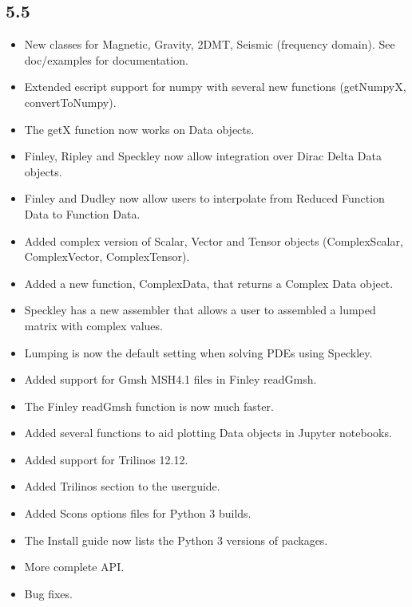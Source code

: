 \subsection*{5.5}
\begin{itemize}
\item New classes for Magnetic, Gravity, 2DMT, Seismic (frequency domain). See doc/examples for documentation.
\item Extended escript support for numpy with several new functions (getNumpyX, convertToNumpy).
\item The getX function now works on Data objects.
\item Finley, Ripley and Speckley now allow integration over Dirac Delta Data objects.
\item Finley and Dudley now allow users to interpolate from Reduced Function Data to Function Data.
\item Added complex version of Scalar, Vector and Tensor objects (ComplexScalar, ComplexVector, ComplexTensor).
\item Added a new function, ComplexData, that returns a Complex Data object.
\item Speckley has a new assembler that allows a user to assembled a lumped matrix with complex values.
\item Lumping is now the default setting when solving PDEs using Speckley.
\item Added support for Gmsh MSH4.1 files in Finley readGmsh.
\item The Finley readGmsh function is now much faster.
\item Added several functions to aid plotting Data objects in Jupyter notebooks.
\item Added support for Trilinos 12.12.
\item Added Trilinos section to the userguide.
\item Added Scons options files for Python 3 builds.
\item The Install guide now lists the Python 3 versions of packages.
\item More complete API.
\item Bug fixes.
\end{itemize}

